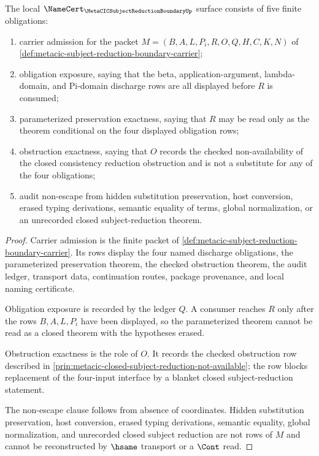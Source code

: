 \begin{theorem}
\label{thm:metacic-subject-reduction-boundary-namecert-obligations}
The local $\NameCert_{\MetaCICSubjectReductionBoundaryUp}$ surface consists of five finite obligations:
\begin{enumerate}
\item carrier admission for the packet $M=(B,A,L,P_i,R,O,Q,H,C,K,N)$ of \autoref{def:metacic-subject-reduction-boundary-carrier};
\item obligation exposure, saying that the beta, application-argument, lambda-domain, and Pi-domain discharge rows are all displayed before $R$ is consumed;
\item parameterized preservation exactness, saying that $R$ may be read only as the theorem conditional on the four displayed obligation rows;
\item obstruction exactness, saying that $O$ records the checked non-availability of the closed consistency reduction obstruction and is not a substitute for any of the four obligations;
\item audit non-escape from hidden substitution preservation, host conversion, erased typing derivations, semantic equality of terms, global normalization, or an unrecorded closed subject-reduction theorem.
\end{enumerate}
\end{theorem}
\begin{proof}
Carrier admission is the finite packet of \autoref{def:metacic-subject-reduction-boundary-carrier}. Its rows display the four named discharge obligations, the parameterized preservation theorem, the checked obstruction theorem, the audit ledger, transport data, continuation routes, package provenance, and local naming certificate.

Obligation exposure is recorded by the ledger $Q$. A consumer reaches $R$ only after the rows $B,A,L,P_i$ have been displayed, so the parameterized theorem cannot be read as a closed theorem with the hypotheses erased.

Obstruction exactness is the role of $O$. It records the checked obstruction row described in \autoref{prin:metacic-closed-subject-reduction-not-available}; the row blocks replacement of the four-input interface by a blanket closed subject-reduction statement.

The non-escape clause follows from absence of coordinates. Hidden substitution preservation, host conversion, erased typing derivations, semantic equality, global normalization, and unrecorded closed subject reduction are not rows of $M$ and cannot be reconstructed by $\hsame$ transport or a $\Cont$ read.
\end{proof}

